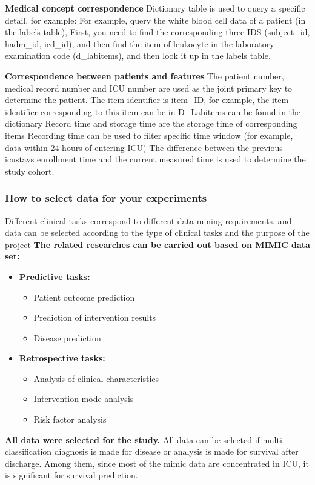 \textbf{Medical concept correspondence}
Dictionary table is used to query a specific detail, for example:
For example, query the white blood cell data of a patient (in the labels table),
First, you need to find the corresponding three IDS (subject\_id, hadm\_id, icd\_id), and then find the item of leukocyte in the laboratory examination code (d\_labitems), and then look it up in the labels table.

\textbf{Correspondence between patients and features}
The patient number, medical record number and ICU number are used as the joint primary key to determine the patient. The item identifier is item\_ID, for example, the item identifier corresponding to this item can be in D\_Labitems can be found in the dictionary Record time and storage time are the storage time of corresponding items Recording time can be used to filter specific time window (for example, data within 24 hours of entering ICU) The difference between the previous icustays enrollment time and the current measured time is used to determine the study cohort.

\subsubsection{How to select data for your experiments}

Different clinical tasks correspond to different data mining requirements, and data can be selected according to the type of clinical tasks and the purpose of the project
\textbf {The related researches can be carried out based on MIMIC data set:}
\begin{itemize}
\item \textbf {Predictive tasks:}
\begin{itemize}
\item Patient outcome prediction 
\item Prediction of intervention results 
\item Disease prediction
\end{itemize}
\item \textbf {Retrospective tasks:}
\begin{itemize}
\item Analysis of clinical characteristics 
\item Intervention mode analysis 
\item Risk factor analysis
\end{itemize}
\end{itemize}

\textbf{All data were selected for the study.} All data can be selected if multi classification diagnosis is made for disease or analysis is made for survival after discharge. Among them, since most of the mimic data are concentrated in ICU, it is significant for survival prediction.

